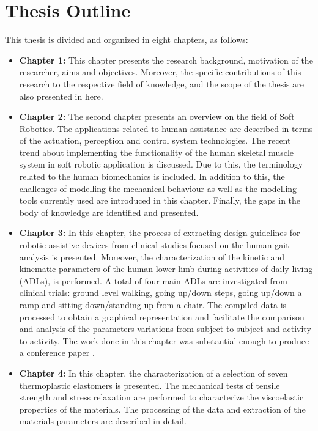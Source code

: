 \section{Thesis Outline}

This thesis is divided and organized in eight chapters, as follows:
\begin{itemize}
    \item {\bf Chapter 1: } This chapter presents the research background, motivation of the researcher, aims and objectives. Moreover, the specific contributions of this research to the respective field of knowledge, and the scope of the thesis are also presented in here.
    \item {\bf Chapter 2:} The second chapter presents an overview on the field of Soft Robotics. The applications related to human assistance are described in terms of the actuation, perception and control system technologies. The recent trend about implementing the functionality of the human skeletal muscle system in soft robotic application is discussed. Due to this, the terminology related to the human biomechanics is included. In addition to this, the challenges of modelling the mechanical behaviour as well as the modelling tools currently used are introduced in this chapter. Finally, the gaps in the body of knowledge are identified and presented.
    \item {\bf Chapter 3:} In this chapter, the process of extracting design guidelines for robotic assistive devices from clinical studies focused on the human gait analysis is presented. Moreover, the characterization of the kinetic and kinematic parameters of the human lower limb during activities of daily living (ADLs), is performed. A total of four main ADLs are investigated from clinical trials: ground level walking, going up/down steps, going up/down a ramp and sitting down/standing up from a chair. The compiled data is processed to obtain a graphical representation and facilitate the comparison and analysis of the parameters variations from subject to subject and activity to activity. The work done in this chapter was substantial enough to produce a conference paper \cite{solis2017characterization}.
    \item {\bf Chapter 4: } In this chapter, the characterization of a selection of seven thermoplastic elastomers is presented. The mechanical tests of tensile strength and stress relaxation are performed to characterize the viscoelastic properties of the materials. The processing of the data and extraction of the materials parameters are described in detail.

\end{itemize}
